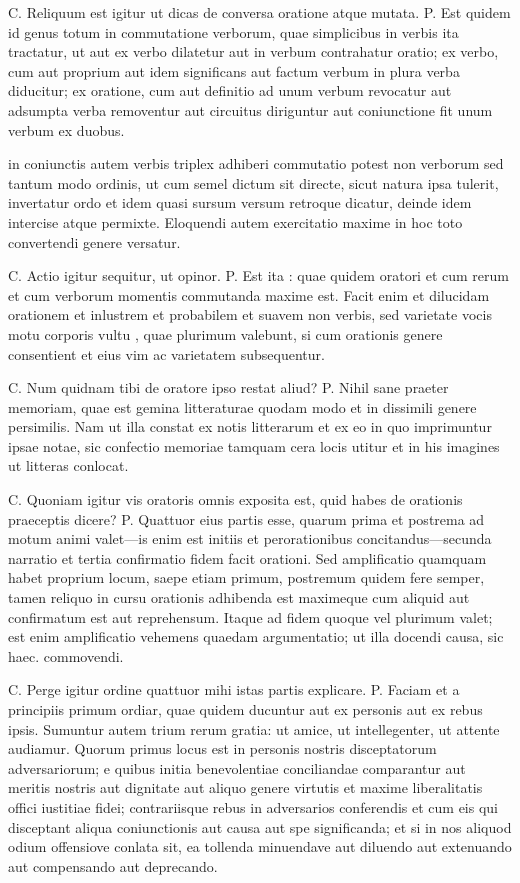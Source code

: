  C. Reliquum est igitur ut dicas de conversa oratione atque mutata. P. Est quidem id genus totum in commutatione verborum, quae simplicibus in verbis ita tractatur, ut aut ex verbo dilatetur aut in verbum contrahatur oratio; ex verbo, cum aut proprium aut idem significans aut factum verbum in plura verba diducitur; ex oratione, cum aut definitio ad unum verbum revocatur aut adsumpta verba removentur aut circuitus diriguntur aut coniunctione fit unum verbum ex duobus.

 in coniunctis autem verbis triplex adhiberi commutatio potest non verborum sed tantum modo ordinis, ut cum semel dictum sit directe, sicut natura ipsa tulerit, invertatur ordo et idem quasi sursum versum retroque dicatur, deinde idem intercise atque permixte. Eloquendi autem exercitatio maxime in hoc toto convertendi genere versatur.

 C. Actio igitur sequitur, ut opinor. P. Est ita : quae quidem oratori et cum rerum et cum verborum momentis commutanda maxime est. Facit enim et dilucidam orationem et inlustrem et probabilem et suavem non verbis, sed varietate vocis motu corporis vultu , quae plurimum valebunt, si cum orationis genere consentient et eius vim ac varietatem subsequentur.

 C. Num quidnam tibi de oratore ipso restat aliud? P. Nihil sane praeter memoriam, quae est gemina litteraturae quodam modo et in dissimili genere persimilis. Nam ut illa constat ex notis litterarum et ex eo in quo imprimuntur ipsae notae, sic confectio memoriae tamquam cera locis utitur et in his imagines ut litteras conlocat.

 C. Quoniam igitur vis oratoris omnis exposita est, quid habes de orationis praeceptis dicere? P. Quattuor eius partis esse, quarum prima et postrema ad motum animi valet—is enim est initiis et perorationibus concitandus—secunda narratio et tertia confirmatio fidem facit orationi. Sed amplificatio quamquam habet proprium locum, saepe etiam primum, postremum quidem fere semper, tamen reliquo in cursu orationis adhibenda est maximeque cum aliquid aut confirmatum est aut reprehensum. Itaque ad fidem quoque vel plurimum valet; est enim amplificatio vehemens quaedam argumentatio; ut illa docendi causa, sic haec. commovendi.

 C. Perge igitur ordine quattuor mihi istas partis explicare. P. Faciam et a principiis primum ordiar, quae quidem ducuntur aut ex personis aut ex rebus ipsis. Sumuntur autem trium rerum gratia: ut amice, ut intellegenter, ut attente audiamur. Quorum primus locus est in personis nostris disceptatorum adversariorum; e quibus initia benevolentiae conciliandae comparantur aut meritis nostris aut dignitate aut aliquo genere virtutis et maxime liberalitatis offici iustitiae fidei; contrariisque rebus in adversarios conferendis et cum eis qui disceptant aliqua coniunctionis aut causa aut spe significanda; et si in nos aliquod odium offensiove conlata sit, ea tollenda minuendave aut diluendo aut extenuando aut compensando aut deprecando.


